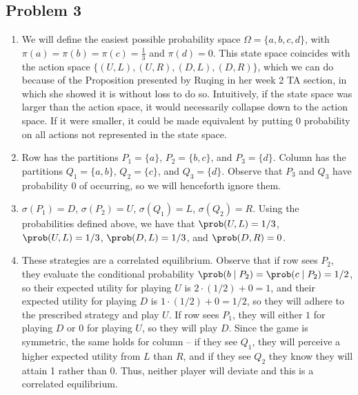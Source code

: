 \documentclass[10pt]{article}
\begin{document}

\subsection*{Problem 3}

\begin{enumerate}
	\item We will define the easiest possible probability space $\Omega = \{a,b,c,d\}$, with $\pi(a) = \pi(b) = \pi(c) = \frac{1}{3}$ and $\pi(d)=0$. This state space coincides with the action space $\{(U,L),(U,R), (D,L),(D,R)\}$, which we can do because of the Proposition presented by Ruqing in her week 2 TA section, in which she showed it is without loss to do so. Intuitively, if the state space was larger than the action space, it would necessarily collapse down to the action space. If it were smaller, it could be made equivalent by putting 0 probability on all actions not represented in the state space.
	\item Row has the partitions $P_1 = \{a\}$, $P_2 = \{b,c\}$, and $P_3 = \{d\}$. Column has the partitions $Q_1 = \{a,b\}$, $Q_2 = \{c\}$, and $Q_3 = \{d\}$. Observe that $P_3$ and $Q_3$ have probability 0 of occurring, so we will henceforth ignore them.
	\item $\sigma(P_1) = D$, $\sigma(P_2) = U$, $\sigma(Q_1) = L$, $\sigma(Q_2) = R$. Using the probabilities defined above, we have that $\prob(U,L) = 1/3$, $\prob(U,L) = 1/3$, $\prob(D,L) = 1/3$, and $\prob(D,R) = 0$.
	\item These strategies are a correlated equilibrium. Observe that if row sees $P_2$, they evaluate the conditional probability $\prob(b \mid P_2) = \prob(c \mid P_2) = 1/2$, so their expected utility for playing $U$ is $2 \cdot (1/2) + 0 = 1$, and their expected utility for playing $D$ is $1 \cdot (1/2) + 0 = 1/2$, so they will adhere to the prescribed strategy and play $U$. If row sees $P_1$, they will either $1$ for playing $D$ or 0 for playing $U$, so they will play $D$. Since the game is symmetric, the same holds for column -- if they see $Q_1$, they will perceive a higher expected utility from $L$ than $R$, and if they see $Q_2$ they know they will attain 1 rather than 0. Thus, neither player will deviate and this is a correlated equilibrium.
\end{enumerate}
\end{document}
